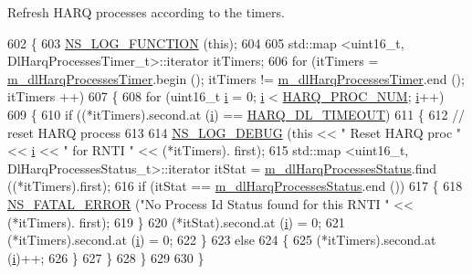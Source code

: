 Refresh H\+A\+RQ processes according to the timers. 


\begin{DoxyCode}
602 \{
603   \hyperlink{log-macros-disabled_8h_a90b90d5bad1f39cb1b64923ea94c0761}{NS\_LOG\_FUNCTION} (\textcolor{keyword}{this});
604 
605   std::map <uint16\_t, DlHarqProcessesTimer\_t>::iterator itTimers;
606   \textcolor{keywordflow}{for} (itTimers = \hyperlink{classns3_1_1TtaFfMacScheduler_ac17ab46a13a0d51459cc7b1d7e5ebc06}{m\_dlHarqProcessesTimer}.begin (); itTimers != 
      \hyperlink{classns3_1_1TtaFfMacScheduler_ac17ab46a13a0d51459cc7b1d7e5ebc06}{m\_dlHarqProcessesTimer}.end (); itTimers ++)
607     \{
608       \textcolor{keywordflow}{for} (uint16\_t \hyperlink{bernuolliDistribution_8m_a6f6ccfcf58b31cb6412107d9d5281426}{i} = 0; \hyperlink{bernuolliDistribution_8m_a6f6ccfcf58b31cb6412107d9d5281426}{i} < \hyperlink{cqa-ff-mac-scheduler_8h_a9185d8d7d2b2979181d4a7044a3d3555}{HARQ\_PROC\_NUM}; \hyperlink{bernuolliDistribution_8m_a6f6ccfcf58b31cb6412107d9d5281426}{i}++)
609         \{
610           \textcolor{keywordflow}{if} ((*itTimers).second.at (\hyperlink{bernuolliDistribution_8m_a6f6ccfcf58b31cb6412107d9d5281426}{i}) == \hyperlink{cqa-ff-mac-scheduler_8h_add9e0c4889dc1b5b25686480b31ad166}{HARQ\_DL\_TIMEOUT})
611             \{
612               \textcolor{comment}{// reset HARQ process}
613               
614               \hyperlink{group__logging_ga413f1886406d49f59a6a0a89b77b4d0a}{NS\_LOG\_DEBUG} (\textcolor{keyword}{this} << \textcolor{stringliteral}{" Reset HARQ proc "} << \hyperlink{bernuolliDistribution_8m_a6f6ccfcf58b31cb6412107d9d5281426}{i} << \textcolor{stringliteral}{" for RNTI "} << (*itTimers).
      first);
615               std::map <uint16\_t, DlHarqProcessesStatus\_t>::iterator itStat = 
      \hyperlink{classns3_1_1TtaFfMacScheduler_a7fca472047b1f964ac6e2b992ed93f66}{m\_dlHarqProcessesStatus}.find ((*itTimers).first);
616               \textcolor{keywordflow}{if} (itStat == \hyperlink{classns3_1_1TtaFfMacScheduler_a7fca472047b1f964ac6e2b992ed93f66}{m\_dlHarqProcessesStatus}.end ())
617                 \{
618                   \hyperlink{group__fatal_ga5131d5e3f75d7d4cbfd706ac456fdc85}{NS\_FATAL\_ERROR} (\textcolor{stringliteral}{"No Process Id Status found for this RNTI "} << (*itTimers).
      first);
619                 \}
620               (*itStat).second.at (\hyperlink{bernuolliDistribution_8m_a6f6ccfcf58b31cb6412107d9d5281426}{i}) = 0;
621               (*itTimers).second.at (\hyperlink{bernuolliDistribution_8m_a6f6ccfcf58b31cb6412107d9d5281426}{i}) = 0;
622             \}
623           \textcolor{keywordflow}{else}
624             \{
625               (*itTimers).second.at (\hyperlink{bernuolliDistribution_8m_a6f6ccfcf58b31cb6412107d9d5281426}{i})++;
626             \}
627         \}
628     \}
629   
630 \}
\end{DoxyCode}


